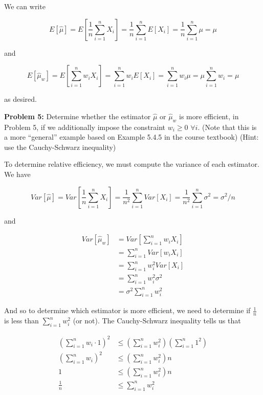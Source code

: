 \documentclass[
  letterpaper,
  DIV=11,
  numbers=noendperiod]{scrreprt}
\begin{document}
We can write

\[
E[\hat{\mu}] = E\left[ \frac{1}{n} \sum_{i = 1}^n X_i \right] = \frac{1}{n}\sum_{i = 1}^n E[X_i] = \frac{1}{n}\sum_{i = 1}^n \mu = \mu
\]

and

\[
E[\hat{\mu}_w] = E \left[ \sum_{i = 1}^n w_i X_i \right] = \sum_{i = 1}^n w_i E \left[ X_i \right] = \sum_{i = 1}^n w_i \mu = \mu \sum_{i = 1}^n w_i = \mu
\]

as desired.

\textbf{Problem 5:} Determine whether the estimator \(\hat{\mu}\) or
\(\hat{\mu}_w\) is more efficient, in Problem 5, if we additionally
impose the constraint \(w_i \geq 0\) \(\forall i\). (Note that this is a
more ``general'' example based on Example 5.4.5 in the course textbook)
(Hint: use the Cauchy-Schwarz inequality)

To determine relative efficiency, we must compute the variance of each
estimator. We have

\[
Var[\hat{\mu}] = Var \left[ \frac{1}{n} \sum_{i = 1}^n X_i \right] = \frac{1}{n^2} \sum_{i = 1}^n Var[X_i] = \frac{1}{n^2} \sum_{i = 1}^n \sigma^2 = \sigma^2 / n
\]

and

\begin{align*}
    Var[\hat{\mu}_w] & =  Var \left[ \sum_{i = 1}^n w_i X_i \right] \\
    & = \sum_{i = 1}^n Var[w_i X_i] \\
    & = \sum_{i = 1}^n w_i^2 Var[X_i] \\
    & = \sum_{i = 1}^n w_i^2  \sigma^2 \\
    & = \sigma^2 \sum_{i = 1}^n w_i^2
\end{align*}

And so to determine which estimator is more efficient, we need to
determine if \(\frac{1}{n}\) is less than \(\sum_{i = 1}^n w_i^2\) (or
not). The Cauchy-Schwarz inequality tells us that

\begin{align*}
    \left( \sum_{i = 1}^n w_i \cdot 1\right)^2 & \leq \left( \sum_{i = 1}^n w_i^2 \right) \left( \sum_{i = 1}^n 1^2 \right) \\
    \left( \sum_{i = 1}^n w_i \right)^2 & \leq \left( \sum_{i = 1}^n w_i^2 \right) n \\
    1 & \leq \left( \sum_{i = 1}^n w_i^2 \right) n  \\
    \frac{1}{n} & \leq \sum_{i = 1}^n w_i^2
\end{align*}
\end{document}
